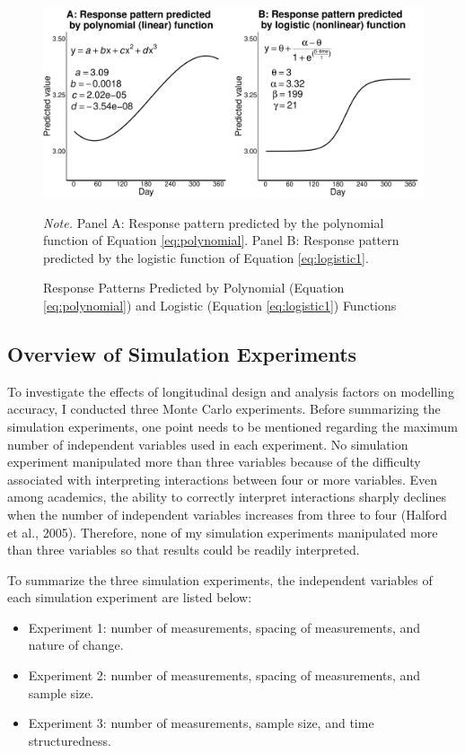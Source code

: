 \documentclass[
  english,
  man,floatsintext]{apa7}
\providecommand{\tightlist}{%
  \setlength{\itemsep}{0pt}\setlength{\parskip}{0pt}}
\newcommand{\figurefootnote}{\raggedright\linespread{2}\fontfamily{phv}\fontsize{9.5pt}{11.4pt}\selectfont \textit{Note. }}
\begin{document}
\begin{figure}[H]
  \caption{Response Patterns Predicted by Polynomial (Equation \ref{eq:polynomial}) and Logistic (Equation \ref{eq:logistic1}) Functions}
  \label{fig:polynomial-vs-logistic}
  \includegraphics{Figures/polynomial_vs_nonlinear_plot} \hfill{}
  \figurefootnote{Panel A: Response pattern predicted by the polynomial function of Equation \eqref{eq:polynomial}. Panel B: Response pattern predicted by the logistic function of Equation \eqref{eq:logistic1}.}
\end{figure}

\hypertarget{overview-of-simulation-experiments}{%
\subsection{Overview of Simulation Experiments}\label{overview-of-simulation-experiments}}

To investigate the effects of longitudinal design and analysis factors on modelling accuracy, I conducted three Monte Carlo experiments. Before summarizing the simulation experiments, one point needs to be mentioned regarding the maximum number of independent variables used in each experiment. No simulation experiment manipulated more than three variables because of the difficulty associated with interpreting interactions between four or more variables. Even among academics, the ability to correctly interpret interactions sharply declines when the number of independent variables increases from three to four (Halford et al., 2005). Therefore, none of my simulation experiments manipulated more than three variables so that results could be readily interpreted.

To summarize the three simulation experiments, the independent variables of each simulation experiment are listed below:

\begin{itemize}
\tightlist
\item
  Experiment 1: number of measurements, spacing of measurements, and nature of change.
\item
  Experiment 2: number of measurements, spacing of measurements, and sample size.
\item
  Experiment 3: number of measurements, sample size, and time structuredness.
\end{itemize}
\end{document}
